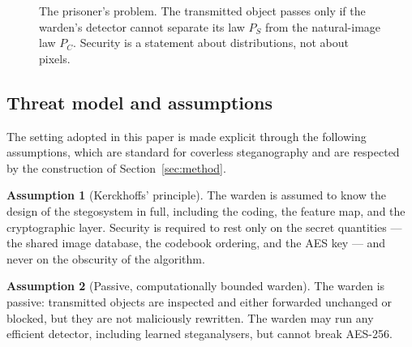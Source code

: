 \documentclass[11pt]{article}
\theoremstyle{definition}
\newtheorem{assumption}{Assumption}[section]
\begin{document}
\begin{figure}[H]
\centering
{}
\caption{The prisoner's problem. The transmitted object passes only if the warden's
detector cannot separate its law $P_S$ from the natural-image law $P_C$. Security is
a statement about distributions, not about pixels.}
\label{fig:warden}
\end{figure}

\subsection{Threat model and assumptions}\label{sec:threat}
The setting adopted in this paper is made explicit through the following
assumptions, which are standard for coverless steganography and are respected by
the construction of Section~\ref{sec:method}.

\begin{assumption}[Kerckhoffs' principle]\label{as:kerckhoffs}
The warden is assumed to know the design of the stegosystem in full, including the
coding, the feature map, and the cryptographic layer. Security is required to rest
only on the secret quantities --- the shared image database, the codebook ordering,
and the AES key --- and never on the obscurity of the algorithm.
\end{assumption}

\begin{assumption}[Passive, computationally bounded warden]\label{as:warden}
The warden is passive: transmitted objects are inspected and either forwarded
unchanged or blocked, but they are not maliciously rewritten. The warden may run
any efficient detector, including learned steganalysers, but cannot break AES-256.
\end{assumption}
\end{document}
